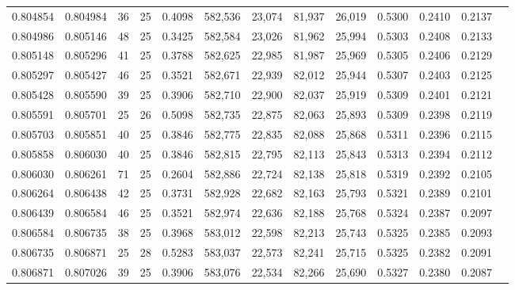 \begin{tabular}{rrrrrrrrrrrrr}
0.804854 & 0.804984 &    36 &  25 &                                     0.4098 & 582,536 &  23,074 &  81,937 &  26,019 & 0.5300 & 0.2410 & 0.2137 \\
0.804986 & 0.805146 &    48 &  25 &                                     0.3425 & 582,584 &  23,026 &  81,962 &  25,994 & 0.5303 & 0.2408 & 0.2133 \\
0.805148 & 0.805296 &    41 &  25 &                                     0.3788 & 582,625 &  22,985 &  81,987 &  25,969 & 0.5305 & 0.2406 & 0.2129 \\
0.805297 & 0.805427 &    46 &  25 &                                     0.3521 & 582,671 &  22,939 &  82,012 &  25,944 & 0.5307 & 0.2403 & 0.2125 \\
0.805428 & 0.805590 &    39 &  25 &                                     0.3906 & 582,710 &  22,900 &  82,037 &  25,919 & 0.5309 & 0.2401 & 0.2121 \\
0.805591 & 0.805701 &    25 &  26 &                                     0.5098 & 582,735 &  22,875 &  82,063 &  25,893 & 0.5309 & 0.2398 & 0.2119 \\
0.805703 & 0.805851 &    40 &  25 &                                     0.3846 & 582,775 &  22,835 &  82,088 &  25,868 & 0.5311 & 0.2396 & 0.2115 \\
0.805858 & 0.806030 &    40 &  25 &                                     0.3846 & 582,815 &  22,795 &  82,113 &  25,843 & 0.5313 & 0.2394 & 0.2112 \\
0.806030 & 0.806261 &    71 &  25 &                                     0.2604 & 582,886 &  22,724 &  82,138 &  25,818 & 0.5319 & 0.2392 & 0.2105 \\
0.806264 & 0.806438 &    42 &  25 &                                     0.3731 & 582,928 &  22,682 &  82,163 &  25,793 & 0.5321 & 0.2389 & 0.2101 \\
0.806439 & 0.806584 &    46 &  25 &                                     0.3521 & 582,974 &  22,636 &  82,188 &  25,768 & 0.5324 & 0.2387 & 0.2097 \\
0.806584 & 0.806735 &    38 &  25 &                                     0.3968 & 583,012 &  22,598 &  82,213 &  25,743 & 0.5325 & 0.2385 & 0.2093 \\
0.806735 & 0.806871 &    25 &  28 &                                     0.5283 & 583,037 &  22,573 &  82,241 &  25,715 & 0.5325 & 0.2382 & 0.2091 \\
0.806871 & 0.807026 &    39 &  25 &                                     0.3906 & 583,076 &  22,534 &  82,266 &  25,690 & 0.5327 & 0.2380 & 0.2087 \\

\end{tabular}
